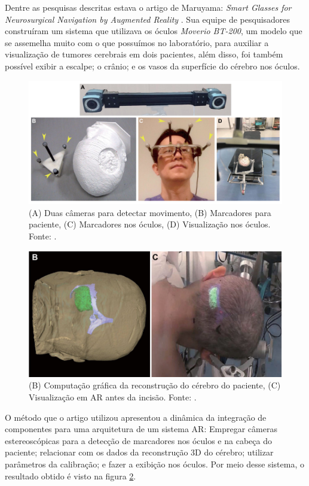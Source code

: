 Dentre as pesquisas descritas estava o artigo de Maruyama: \textit{Smart Glasses for Neurosurgical Navigation by Augmented Reality} \cite{Maruyama2018}. Sua equipe de pesquisadores construíram um sistema que utilizava os óculos \textit{Moverio BT-200}, um modelo que se assemelha muito com o que possuímos no laboratório, para auxiliar a visualização de tumores cerebrais em dois pacientes, além disso, foi também possível exibir a escalpe; o crânio; e os vasos da superfície do cérebro nos óculos.

\begin{figure}[ht]
    \centering
    \includegraphics[width=.65\linewidth]{figuras/Maruyama.png}
    \caption{(A) Duas câmeras para detectar movimento, (B) Marcadores para paciente, (C) Marcadores nos óculos, (D) Visualização nos óculos. Fonte: \cite{Maruyama2018}.}
    \label{fig:maruyama}
\end{figure}

\begin{figure}
    \centering
    \includegraphics[width=.65\linewidth]{figuras/maruyama-overlay.png}
    \caption{(B) Computação gráfica da reconstrução do cérebro do paciente, (C) Visualização em AR antes da incisão. Fonte: \cite{Maruyama2018}.}
    \label{fig:maruyama-overlay}
\end{figure}

O método que o artigo utilizou apresentou a dinâmica da integração de componentes para uma arquitetura de um sistema AR: Empregar câmeras estereoscópicas para a detecção de marcadores nos óculos e na cabeça do paciente; relacionar com os dados da reconstrução 3D do cérebro; utilizar parâmetros da calibração; e fazer a exibição nos óculos. Por meio desse sistema, o resultado obtido é visto na figura \ref{fig:maruyama-overlay}.

